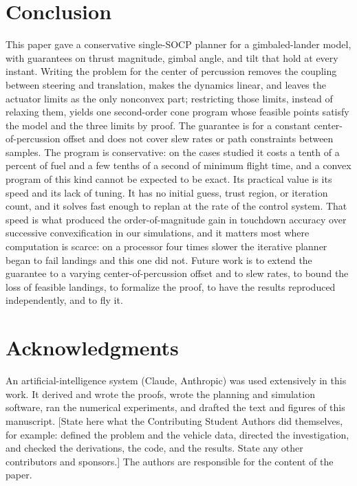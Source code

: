 \section{Conclusion}
This paper gave a conservative single-SOCP planner for a gimbaled-lander model, with guarantees on thrust magnitude, gimbal
angle, and tilt that hold at every instant. Writing the problem for the center of percussion removes the coupling between
steering and translation, makes the dynamics linear, and leaves the actuator limits as the only nonconvex part; restricting
those limits, instead of relaxing them, yields one second-order cone program whose feasible points satisfy the model and the
three limits by proof. The guarantee is for a constant center-of-percussion offset and does not cover slew rates or path
constraints between samples. The program is conservative: on the cases studied it costs a tenth of a percent of fuel and a few
tenths of a second of minimum flight time, and a convex program of this kind cannot be expected to be exact. Its practical
value is its speed and its lack of tuning. It has no initial guess, trust region, or iteration count, and it solves fast enough
to replan at the rate of the control system. That speed is what produced the order-of-magnitude gain in touchdown accuracy over successive
convexification in our simulations, and it matters most where computation is scarce: on a processor four times slower the
iterative planner began to fail landings and this one did not. Future work is to extend the guarantee to a varying
center-of-percussion offset and to slew rates, to bound the loss of feasible landings, to formalize the proof, to have the
results reproduced independently, and to fly it.

\section*{Acknowledgments}
An artificial-intelligence system (Claude, Anthropic) was used extensively in this work. It derived and wrote the proofs,
wrote the planning and simulation software, ran the numerical experiments, and drafted the text and figures of this
manuscript. [State here what the Contributing Student Authors did themselves, for example: defined the problem and the
vehicle data, directed the investigation, and checked the derivations, the code, and the results. State any other
contributors and sponsors.] The authors are responsible for the content of the paper.

